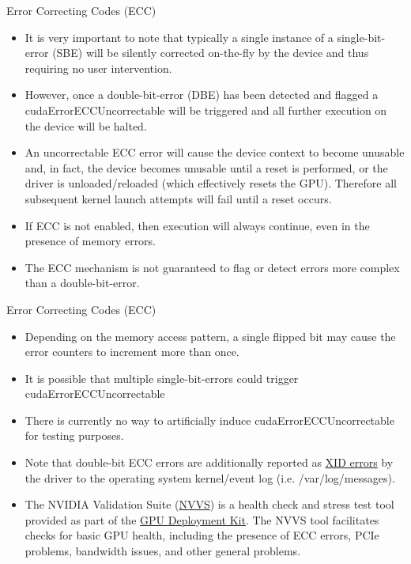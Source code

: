 \documentclass[handout]{beamer}
\begin{document}
\begin{frame}{Error Correcting Codes (ECC)}
\begin{itemize}
	\item<1->It is very important to note that typically a single instance of a single-bit-error (SBE) will be silently corrected on-the-fly by the device and thus requiring no user intervention.
	\item<1->However, once a double-bit-error (DBE) has been detected and flagged a {\selectfont cudaErrorECCUncorrectable} will be triggered and all further execution on the device will be halted. 
	\item<1->An uncorrectable ECC error will cause the device context to become unusable and, in fact, the device becomes unusable until a reset is performed, or the driver is unloaded/reloaded (which effectively resets the GPU).  Therefore all subsequent kernel launch attempts will fail until a reset occurs.
	\item<1-> If ECC is not enabled, then execution will always continue, even in the presence of memory errors.
	\item<1->The ECC mechanism is not guaranteed to flag or detect errors more complex than a double-bit-error.
\end{itemize}
\end{frame}

\begin{frame}{Error Correcting Codes (ECC)}
\begin{itemize}
	\item<1->Depending on the memory access pattern, a single flipped bit may cause the error counters to increment more than once.
	\item<1->It is possible that multiple single-bit-errors could trigger {\selectfont cudaErrorECCUncorrectable}
	\item<1->There is currently no way to artificially induce {\selectfont cudaErrorECCUncorrectable} for testing purposes.
	\item<1->Note that double-bit ECC errors are additionally reported as \href{http://docs.nvidia.com/deploy/xid-errors/index.html}{\color{blue}XID errors} by the driver to the operating system kernel/event log (i.e. {\selectfont /var/log/messages}).
	\item<1->The NVIDIA Validation Suite (\href{http://docs.nvidia.com/deploy/nvvs-user-guide/index.html}{\color{blue}NVVS}) is a health check and stress test tool provided as part of the \href{https://developer.nvidia.com/gpu-deployment-kit}{\color{blue}GPU Deployment Kit}. The NVVS tool facilitates checks for basic GPU health, including the presence of ECC errors, PCIe problems, bandwidth issues, and other general problems. 
\end{itemize}
\end{frame}
\end{document}
